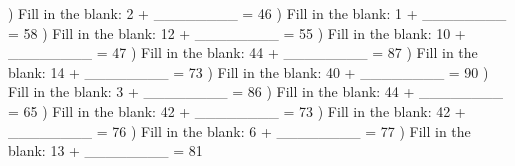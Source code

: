 \documentclass{article}%
\begin{document}
) Fill in the blank: 2 + \_\_\_\_\_\_\_\_ = 46%
\newline%
\newline%
) Fill in the blank: 1 + \_\_\_\_\_\_\_\_ = 58%
\newline%
\newline%
) Fill in the blank: 12 + \_\_\_\_\_\_\_\_ = 55%
\newline%
\newline%
) Fill in the blank: 10 + \_\_\_\_\_\_\_\_ = 47%
\newline%
\newline%
) Fill in the blank: 44 + \_\_\_\_\_\_\_\_ = 87%
\newline%
\newline%
) Fill in the blank: 14 + \_\_\_\_\_\_\_\_ = 73%
\newline%
\newline%
) Fill in the blank: 40 + \_\_\_\_\_\_\_\_ = 90%
\newline%
\newline%
) Fill in the blank: 3 + \_\_\_\_\_\_\_\_ = 86%
\newline%
\newline%
) Fill in the blank: 44 + \_\_\_\_\_\_\_\_ = 65%
\newline%
\newline%
) Fill in the blank: 42 + \_\_\_\_\_\_\_\_ = 73%
\newline%
\newline%
) Fill in the blank: 42 + \_\_\_\_\_\_\_\_ = 76%
\newline%
\newline%
) Fill in the blank: 6 + \_\_\_\_\_\_\_\_ = 77%
\newline%
\newline%
) Fill in the blank: 13 + \_\_\_\_\_\_\_\_ = 81%
\newline%
\newline%
\end{document}
